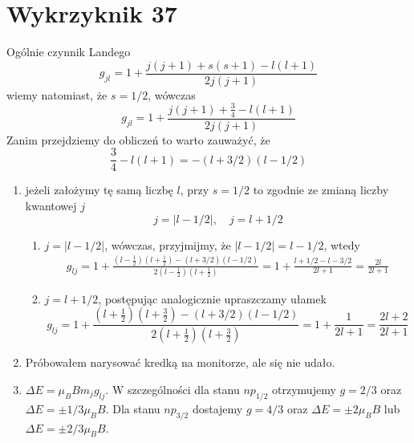 \documentclass[a4paper,12pt]{article}
\begin{document}
\section{Wykrzyknik 37}
Ogólnie czynnik Landego
$$
g_{jl} = 1+\frac{j(j+1) +s(s+1)-l(l+1)}{2j(j+1)}
$$
wiemy natomiast, że $s=1/2$, wówczas
$$
g_{jl} = 1+\frac{j(j+1) +\frac{3}{4}-l(l+1)}{2j(j+1)}
$$
Zanim przejdziemy do obliczeń to warto zauważyć, że 
$$
\frac{3}{4}-l(l+1) = -(l+3/2)(l-1/2)
$$
\begin{enumerate}
	\item jeżeli założymy tę samą liczbę $l$, przy $s=1/2$ to zgodnie ze zmianą liczby kwantowej $j$
	$$
	j = |l-1/2|,\quad j=l+1/2
	$$
	\begin{enumerate}
		\item $ j = |l-1/2|$, wówczas, przyjmijmy, że $|l-1/2|=l-1/2$, wtedy
		$$
		\begin{gathered}
			g_{lj} = 1 + \frac{(l-\frac{1}{2})(l+\frac{1}{2})-(l+3/2)(l-1/2)}{2(l-\frac{1}{2})(l+\frac{1}{2})} = 1+\frac{l+1/2-l-3/2}{2l+1} = \frac{2l}{2l+1}
		\end{gathered}
		$$
		\item $j=l+1/2$, postępując analogicznie upraszczamy ułamek
		$$
		g_{lj} = 1 + \frac{(l+\frac{1}{2})(l+\frac{3}{2})-(l+3/2)(l-1/2)}{2(l+\frac{1}{2})(l+\frac{3}{2})} = 1+\frac{1}{2l+1} = \frac{2l+2}{2l+1}
		$$
	\end{enumerate}
\item Próbowałem narysować kredką na monitorze, ale się nie udało.
\item $\Delta E = \mu_B B m_j g_{lj}$. W szczególności dla stanu $np_{1/2}$ otrzymujemy $g = 2/3$ oraz $\Delta E = \pm 1/3 \mu_B B$. Dla stanu $np_{3/2}$ dostajemy $g = 4/3$ oraz $\Delta E = \pm 2\mu_B B$ lub $\Delta E = \pm 2/3 \mu_B B$.
\end{enumerate}
\end{document}
